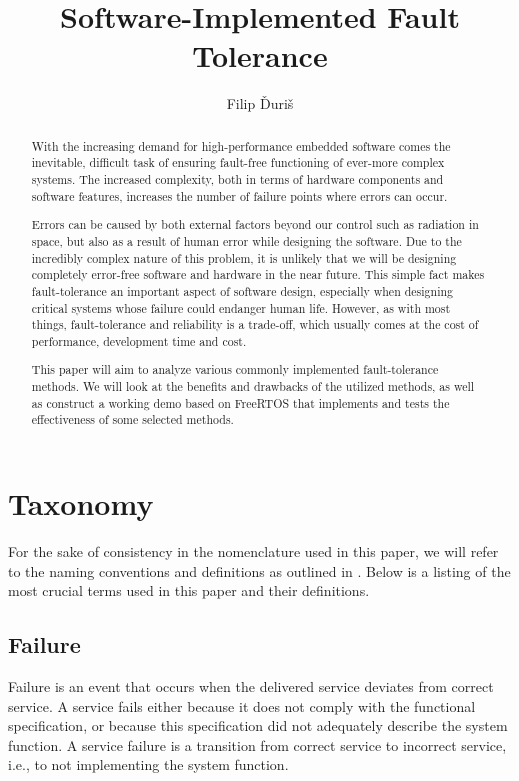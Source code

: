 \documentclass[12pt, letterpaper]{article}
\title{\Huge \textbf{Software-Implemented Fault Tolerance}}
\author{Filip Ďuriš}
\begin{document}
\maketitle

\newpage

\begin{abstract}
With the increasing demand for high-performance embedded software comes the inevitable, difficult task of ensuring fault-free functioning of ever-more complex systems. The increased complexity, both in terms of hardware components and software features, increases the number of failure points where errors can occur.

Errors can be caused by both external factors beyond our control such as radiation in space, but also as a result of human error while designing the software. Due to the incredibly complex nature of this problem, it is unlikely that we will be designing completely error-free software and hardware in the near future. This simple fact makes fault-tolerance an important aspect of software design, especially when designing critical systems whose failure could endanger human life. However, as with most things, fault-tolerance and reliability is a trade-off, which usually comes at the cost of performance, development time and cost.

This paper will aim to analyze various commonly implemented fault-tolerance methods. We will look at the benefits and drawbacks of the utilized methods, as well as construct a working demo based on FreeRTOS that implements and tests the effectiveness of some selected methods.
\end{abstract}



\section{Taxonomy}

For the sake of consistency in the nomenclature used in this paper, we will refer to the naming conventions and definitions as outlined in \cite{1335465}. Below is a listing of the most crucial terms used in this paper and their definitions.

\subsection{Failure}
Failure is an event that occurs when the delivered service deviates from correct service. A service fails either because it does not comply with the functional specification, or because this specification did not adequately describe the system function. A service failure is a transition from correct service to incorrect service, i.e., to not implementing the system function. 
\end{document}
